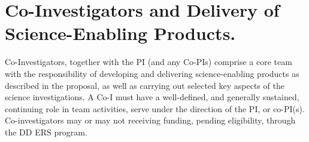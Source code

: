 \section*{Co-Investigators and Delivery of Science-Enabling Products.}
Co-Investigators, together with the PI (and any Co-PIs) comprise a core team with the responsibility of developing and delivering science-enabling products as described in the proposal, as well as carrying out selected key aspects of the science investigations.  A Co-I must have a well-defined, and generally sustained, continuing role in team activities, serve under the direction of the PI, or co-PI(s). Co-investigators may or may not receiving funding, pending eligibility, through the DD ERS program. 

%




